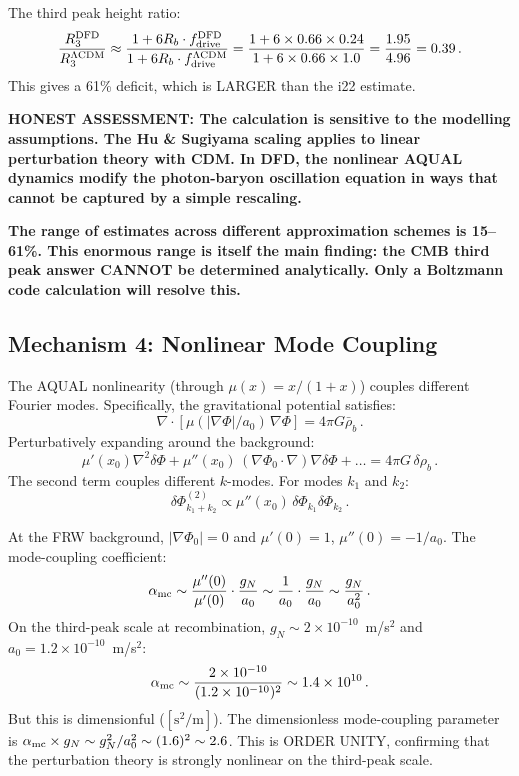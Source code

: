 \documentclass[11pt]{article}
\newcommand{\ee}[1]{\times 10^{#1}}
\newcommand{\aM}{a_0}
\newcommand{\rhob}{\bar{\rho}_b}
\begin{document}
The third peak height ratio:
\begin{equation}
\frac{R_3^{\rm DFD}}{R_3^{\Lambda\rm CDM}}
\approx \frac{1 + 6R_b\cdot f_{\rm drive}^{\rm DFD}}
{1 + 6R_b\cdot f_{\rm drive}^{\Lambda\rm CDM}}
= \frac{1 + 6\times 0.66 \times 0.24}{1 + 6\times 0.66 \times 1.0}
= \frac{1.95}{4.96} = 0.39\,.
\end{equation}
This gives a 61\% deficit, which is LARGER than the i22 estimate.

\textbf{HONEST ASSESSMENT:  The calculation is sensitive to the
modelling assumptions.  The Hu \& Sugiyama scaling applies to linear
perturbation theory with CDM.  In DFD, the nonlinear AQUAL dynamics
modify the photon-baryon oscillation equation in ways that cannot be
captured by a simple rescaling.}

\textbf{The range of estimates across different approximation schemes
is 15--61\%.  This enormous range is itself the main finding: the
CMB third peak answer CANNOT be determined analytically.  Only a
Boltzmann code calculation will resolve this.}

\subsection{Mechanism 4: Nonlinear Mode Coupling}

The AQUAL nonlinearity (through $\mu(x) = x/(1+x)$) couples different
Fourier modes.  Specifically, the gravitational potential satisfies:
\begin{equation}
\nabla\cdot[\mu(|\nabla\Phi|/\aM)\,\nabla\Phi] = 4\pi G\rhob\,.
\end{equation}
Perturbatively expanding around the background:
\begin{equation}
\mu'(x_0)\nabla^2\delta\Phi + \mu''(x_0)\,(\nabla\Phi_0\cdot\nabla)
\nabla\delta\Phi + \ldots = 4\pi G\,\delta\rho_b\,.
\end{equation}
The second term couples different $k$-modes.  For modes $k_1$ and $k_2$:
\begin{equation}
\delta\Phi_{k_1+k_2}^{(2)} \propto \mu''(x_0)\,\delta\Phi_{k_1}
\delta\Phi_{k_2}\,.
\end{equation}

At the FRW background, $|\nabla\Phi_0| = 0$ and $\mu'(0) = 1$,
$\mu''(0) = -1/\aM$.  The mode-coupling coefficient:
\begin{equation}
\alpha_{\rm mc} \sim \frac{\mu''(0)}{\mu'(0)}\cdot\frac{g_N}{\aM}
\sim \frac{1}{\aM}\cdot\frac{g_N}{\aM} \sim \frac{g_N}{\aM^2}\,.
\end{equation}
On the third-peak scale at recombination, $g_N \sim 2\ee{-10}$~m/s$^2$
and $\aM = 1.2\ee{-10}$~m/s$^2$:
\begin{equation}
\alpha_{\rm mc} \sim \frac{2\ee{-10}}{(1.2\ee{-10})^2} \sim 1.4\ee{10}\,.
\end{equation}
But this is dimensionful ($[\text{s}^2/\text{m}]$).  The dimensionless
mode-coupling parameter is $\alpha_{\rm mc}\times g_N \sim g_N^2/\aM^2
\sim (1.6)^2 \sim 2.6$.  This is ORDER UNITY, confirming that the
perturbation theory is strongly nonlinear on the third-peak scale.
\end{document}
